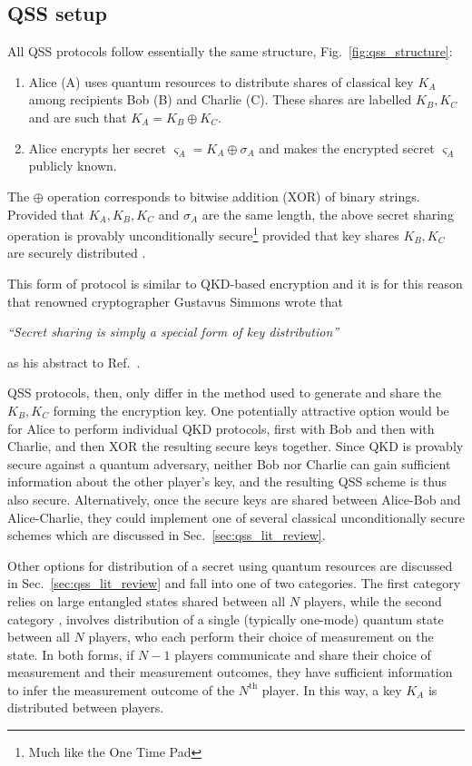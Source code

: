 \subsection{QSS setup}

All QSS protocols follow essentially the same structure, Fig.~\ref{fig:qss_structure}:
\begin{enumerate}
\item Alice (A) uses quantum resources to distribute shares of classical key $K_A$ among recipients Bob (B) and Charlie (C). These shares are labelled $K_B, K_C$ and are such that $K_A = K_B \oplus K_C$.
\item Alice encrypts her secret $\varsigma_A = K_A \oplus \sigma_A$ and makes the encrypted secret $\varsigma_A$ publicly known.
\end{enumerate}
The $\oplus$ operation corresponds to bitwise addition (XOR) of binary strings. Provided that $K_A, K_B, K_C$ and $\sigma_A$ are the same length, the above secret sharing operation is provably unconditionally secure\footnote{Much like the One Time Pad} provided that key shares $K_B, K_C$ are securely distributed \cite{Schneier1996}.

This form of protocol is similar to QKD-based encryption and it is for this reason that renowned cryptographer Gustavus Simmons wrote that 

\begin{center}\emph{``Secret sharing is simply a special form of key distribution''}\end{center}

\noindent as his abstract to Ref.~\cite{Simmons1990a}.

QSS protocols, then, only differ in the method used to generate and share the $K_B, K_C$ forming the encryption key. One potentially attractive option would be for Alice to perform individual QKD protocols, first with Bob and then with Charlie, and then XOR the resulting secure keys together. Since QKD is provably secure against a quantum adversary, neither Bob nor Charlie can gain sufficient information about the other player's key, and the resulting QSS scheme is thus also secure. Alternatively, once the secure keys are shared between Alice-Bob and Alice-Charlie, they could implement one of several classical unconditionally secure schemes which are discussed in Sec.~\ref{sec:qss_lit_review}.

Other options for distribution of a secret using quantum resources are discussed in Sec.~\ref{sec:qss_lit_review} and fall into one of two categories. The first category \cite{Hillery1999, Karlsson1999, Gottesman1999, Markham2008, Wu2016, Kogias2017} relies on large entangled states shared between all $N$ players, while the second category \cite{Zhang2005a, Schmid2005, Schmid2007, Grice2019}, involves distribution of a single (typically one-mode) quantum state between all $N$ players, who each perform their choice of measurement on the state. In both forms, if $N-1$ players communicate and share their choice of measurement and their measurement outcomes, they have sufficient information to infer the measurement outcome of the $N^{\text{th}}$ player. In this way, a key $K_A$ is distributed between players.


